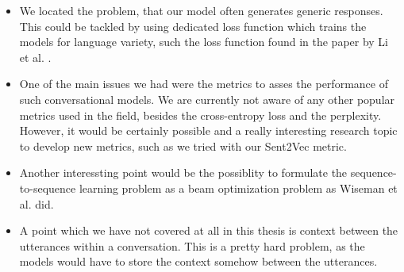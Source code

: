 \begin{itemize}
  \item We located the problem, that our model often generates generic responses. This could be tackled by using dedicated loss function which trains the models for language variety, such the loss function found in the paper by Li et al. \cite{Li:2016}.

  \item One of the main issues we had were the metrics to asses the performance of such conversational models. We are currently not aware of any other popular metrics used in the field, besides the cross-entropy loss and the perplexity. However, it would be certainly possible and a really interesting research topic to develop new metrics, such as we tried with our Sent2Vec metric.

  \item Another interessting point would be the possiblity to formulate the sequence-to-sequence learning problem as a beam optimization problem as Wiseman et al. \cite{Wiseman:2016} did.

  \item A point which we have not covered at all in this thesis is context between the utterances within a conversation. This is a pretty hard problem, as the models would have to store the context somehow between the utterances.
\end{itemize}

